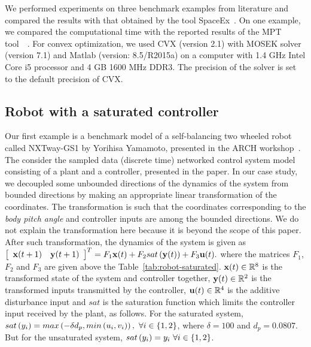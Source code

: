 We performed experiments on three benchmark examples from literature
and compared the results with that obtained by the tool
SpaceEx~\cite{TODO}. On one example, we compared the computational
time with the reported results of the MPT
tool~~\cite{rakovic2004computation}.  For convex optimization, we used
CVX (version 2.1) with MOSEK solver (version 7.1) and Matlab (version:
8.5/R2015a) on a computer with 1.4 GHz Intel Core i5 processor and 4 GB
1600 MHz DDR3.  The precision of the solver is set to the default
precision of CVX.


\subsection{Robot with a saturated controller}   Our first example is a benchmark
model of a self-balancing two wheeled robot called NXTway-GS1 by
Yorihisa Yamamoto, presented in the ARCH
workshop~\cite{heinz2014benchmark}.  The consider the sampled data
(discrete time) networked control system model consisting of a plant
and a controller, presented in the paper.   In our case study, we
decoupled some unbounded directions of the dynamics of the system from
bounded directions by making an appropriate linear transformation of
the coordinates.  The transformation is such that the coordinates
corresponding to the \emph{body pitch angle} and controller inputs are
among the bounded directions.  We do not explain the transformation
here because it is beyond the scope of this paper.  After such
transformation, the dynamics of the system is given as $
\left[\begin{array}{cc}{\bf x}(t+1) &
    {\bf y}(t+1)\end{array}\right]^T=F_1{\bf x}(t)+F_2sat\left({\bf y}(t)\right)+F_3{\bf u}(t).$
where the matrices $F_1$, $F_2$ and $F_3$ are given above the
Table~\ref{tab:robot-saturated}. ${\bf x}(t)\in\mathbb{R}^8$ is the
transformed state of the system and controller together,
${\bf y}(t)\in\mathbb{R}^2$ is the transformed inputs transmitted by the
controller, ${\bf u}(t)\in\mathbb{R}^4$ is the additive disturbance
input and $sat$ is the saturation function which limits the controller
input received by the plant, as follows.  For the saturated system,
$sat\left(y_i\right) = max\left(-\delta d_p,min\left(u_i,v_i\right)\right),~\forall
i\in\{1,2\}$, where $\delta=100$ and $d_p=0.0807$.  But for the
unsaturated system, $sat\left(y_i\right)=y_i~\forall i\in\{1,2\}$.
%

